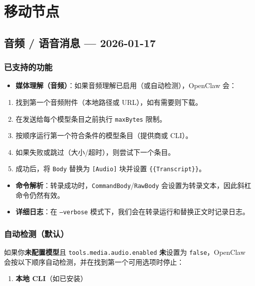 \chapter{移动节点}

\section{音频 / 语音消息 — 2026-01-17}


\subsection{已支持的功能}


\begin{itemize}
  \item \textbf{媒体理解（音频）}：如果音频理解已启用（或自动检测），OpenClaw 会：
\end{itemize}

\begin{enumerate}
  \item 找到第一个音频附件（本地路径或 URL），如有需要则下载。
  \item 在发送给每个模型条目之前执行 \texttt{maxBytes} 限制。
  \item 按顺序运行第一个符合条件的模型条目（提供商或 CLI）。
  \item 如果失败或跳过（大小/超时），则尝试下一个条目。
  \item 成功后，将 \texttt{Body} 替换为 \texttt{[Audio]} 块并设置 \texttt{\{\{Transcript\}\}}。
\end{enumerate}

\begin{itemize}
  \item \textbf{命令解析}：转录成功时，\texttt{CommandBody}/\texttt{RawBody} 会设置为转录文本，因此斜杠命令仍然有效。
  \item \textbf{详细日志}：在 \texttt{--verbose} 模式下，我们会在转录运行和替换正文时记录日志。
\end{itemize}


\subsection{自动检测（默认）}


如果你\textbf{未配置模型}且 \texttt{tools.media.audio.enabled} \textbf{未}设置为 \texttt{false}，OpenClaw 会按以下顺序自动检测，并在找到第一个可用选项时停止：

\begin{enumerate}
  \item \textbf{本地 CLI}（如已安装）
\end{enumerate}

